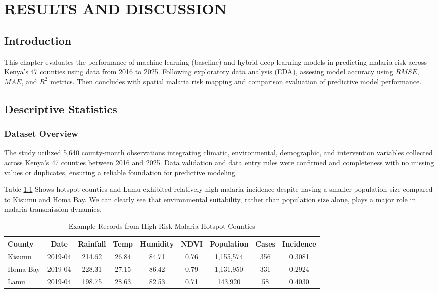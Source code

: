 \chapter{RESULTS AND DISCUSSION}
\label{ch:results}
\section{Introduction}
This chapter evaluates the performance of machine learning (baseline) and hybrid deep learning models in predicting malaria risk across Kenya's 47 counties using data from 2016 to 2025. Following exploratory data analysis (EDA), assesing model accuracy using $RMSE$, $MAE$, and $R^2$ metrics. Then concludes with spatial malaria risk mapping and comparison evaluation of predictive model performance.

\section{Descriptive Statistics }
\subsection{Dataset Overview}
   The study utilized 5,640 county-month observations integrating climatic, environmental, demographic, and intervention variables collected across Kenya's 47 counties between 2016 and 2025. Data validation  and data entry rules  were confirmed and completeness with no missing values or duplicates, ensuring a reliable foundation for predictive modeling.
   
    Table \ref{tab:hotspot_data_structure} Shows hotspot counties and Lamu  exhibited relatively high malaria incidence despite having a smaller population size compared to Kisumu and Homa Bay. We can clearly see that environmental suitability, rather than population size alone, plays a major role in malaria transmission dynamics. 
\begin{table}[H]
	\centering
	\caption{Example Records from High-Risk Malaria Hotspot Counties}
	\label{tab:hotspot_data_structure}
	\small
	\begin{tabular}{lcccccccc}
		\hline
		County & Date & Rainfall & Temp & Humidity & NDVI & Population & Cases & Incidence \\
		\hline
		Kisumu & 2019-04 & 214.62 & 26.84 & 84.71 & 0.76 & 1,155,574 & 356 & 0.3081 \\
		Homa Bay & 2019-04 & 228.31 & 27.15 & 86.42 & 0.79 & 1,131,950 & 331 & 0.2924 \\
		Lamu & 2019-04 & 198.75 & 28.63 & 82.53 & 0.71 & 143,920 & 58 & 0.4030 \\
		\hline
	\end{tabular}
\end{table}

